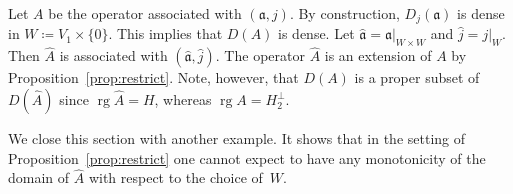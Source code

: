 \documentclass[a4paper,oneside,12pt]{amsart}
\theoremstyle{plain}
\theoremstyle{definition}
\newenvironment{example}
{\pushQED{\qed}

\examplex}
{\popQED\endexamplex}
\begin{document}
\begin{example}
Let $A$ be the operator associated with $({{\mathfrak{{a}}}},j)$. By construction, $D_j({{\mathfrak{{a}}}})$ is dense in $W\coloneqq V_1\times\{0\}$. 
This implies that $D(A)$ is dense.
Let ${{\mathfrak{{\hat{a}}}}}={\ensuremath{{{{\mathfrak{{a}}}}}|_{{W\times W}}}}$ and $\hat{j}={\ensuremath{{j}|_{{W}}}}$.
Then $\widehat{A}$ is associated with $({{\mathfrak{{\hat{a}}}}},\hat{j})$. The operator $\widehat{A}$ is
an extension of $A$ by Proposition~\ref{prop:restrict}. Note, however, that $D(A)$ is a proper subset of $D(\widehat{A})$ since $\operatorname{rg} \widehat{A} = H$, whereas $\operatorname{rg} A=H_2^\perp$.
\end{example}

We close this section with another example.
It shows that in the setting of Proposition~\ref{prop:restrict} one cannot expect
to have any monotonicity of the domain of $\widehat{A}$ with respect to the choice of~$W$.
\end{document}
